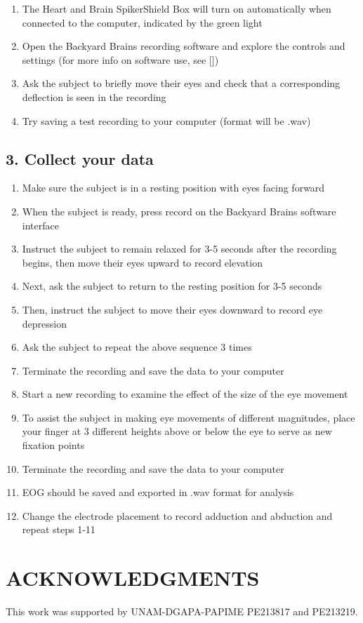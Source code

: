 \documentclass[12pt]{article}
\begin{document}
\begin{enumerate}
\item The Heart and Brain SpikerShield Box will turn on automatically when 
connected to the computer, indicated by the green light 
\item Open the Backyard Brains recording software and explore the controls and settings (for more info on software use, see [\cite{spikeRecorder}]) 
\item Ask the subject to briefly move their eyes and check that a corresponding deflection is seen in the recording
\item Try saving a test recording to your computer (format will be .wav)
\end{enumerate}

\subsection*{3. Collect your data}

\begin{enumerate}
\item Make sure the subject is in a resting position with eyes facing forward
\item When the subject is ready, press record on the Backyard Brains software interface
\item Instruct the subject to remain relaxed for 3-5 seconds after the recording begins, then move their eyes upward to record elevation
\item Next, ask the subject to return to the resting position for 3-5 seconds 
\item Then, instruct the subject to move their eyes downward to record eye depression
\item Ask the subject to repeat the above sequence 3 times 
\item Terminate the recording and save the data to your computer
\item Start a new recording to examine the effect of the size of the eye movement
\item To assist the subject in making eye movements of different magnitudes, place your finger at 3 different heights above or below the eye to serve as new fixation points
\item Terminate the recording and save the data to your computer 
\item EOG should be saved and exported in .wav format for analysis
\item Change the electrode placement to record adduction and abduction and repeat steps 1-11
\end{enumerate}

\section*{ACKNOWLEDGMENTS}
This work was supported by UNAM-DGAPA-PAPIME PE213817 and PE213219.

\renewcommand\refname{REFERENCES}
\renewcommand{\markboth}[2]{}%
\begin{footnotesize}

\end{footnotesize}
\end{document}
